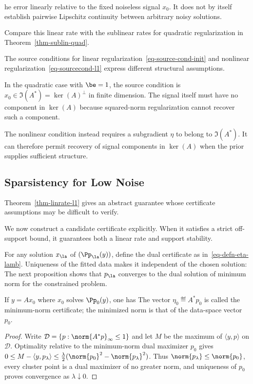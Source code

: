 he error linearly relative to the fixed noiseless signal $x_0$. It does not by itself establish pairwise Lipschitz continuity between arbitrary noisy solutions.


Compare this linear rate with the sublinear rates for quadratic regularization in Theorem~\ref{thm-sublin-quad}.
 
The source conditions for linear regularization~\eqref{eq-source-cond-init} and nonlinear regularization~\eqref{eq-sourcecond-l1} express different structural assumptions.
 
In the quadratic case with $\be=1$, the source condition is $x_0\in\Im(A^*)=\ker(A)^\bot$ in finite dimension. The signal itself must have no component in $\ker(A)$ because squared-norm regularization cannot recover such a component.
 
The nonlinear condition instead requires a subgradient $\eta$ to belong to $\Im(A^*)$. It can therefore permit recovery of signal components in $\ker(A)$ when the prior supplies sufficient structure.

 
 
                                        
\subsection{Sparsistency for Low Noise}
\label{sec-sparsistency}

Theorem~\ref{thm-linrate-l1} gives an abstract guarantee whose certificate assumptions may be difficult to verify.
 
We now construct a candidate certificate explicitly. When it satisfies a strict off-support bound, it guarantees both a linear rate and support stability.


For any solution $x_\la$ of $(\Pp_\la(y))$, define the dual certificate as in~\eqref{eq-defn-eta-lamb}. Uniqueness of the fitted data makes it independent of the chosen solution:
The next proposition shows that $p_\la$ converges to the dual solution of minimum norm for the constrained problem.

\begin{prop}
	If $y = A x_0$ where $x_0$ solves $\Pp_0(y)$, one has
	The vector $\eta_0\eqdef A^*p_0$ is called the minimum-norm certificate; the minimized norm is that of the data-space vector $p_0$.
\end{prop}
\begin{proof}
	Write $\mathcal D=\{p:\norm{A^*p}_\infty\leq1\}$ and let $M$ be the maximum of $\langle y,p\rangle$ on $\mathcal D$. Optimality relative to the minimum-norm dual maximizer $p_0$ gives $0\leq M-\langle y,p_\lambda\rangle\leq\frac\lambda2(\norm{p_0}^2-\norm{p_\lambda}^2)$. Thus $\norm{p_\lambda}\leq\norm{p_0}$, every cluster point is a dual maximizer of no greater norm, and uniqueness of $p_0$ proves convergence as $\lambda\downarrow0$.
\end{proof}

